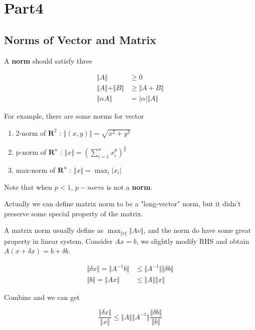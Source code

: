 \section{Part4}

\subsection{Norms of Vector and Matrix}

A \textbf{norm} should satisfy three

\begin{align}
  \Vert A \Vert &\geq 0 \nonumber \\
  \Vert A \Vert + \Vert B \Vert &\geq \Vert A+B \Vert \nonumber \\
  \Vert \alpha A \Vert &= |\alpha| \Vert A \Vert \nonumber
\end{align}

For example, there are some norms for vector
\begin{enumerate}
  \item 2-norm of $\mathbf{R} ^ 2$ :
    $\Vert (x, y) \Vert = \sqrt{x^2 + y^2}$
  \item p-norm of $\mathbf{R} ^ n$ :
    $\Vert x \Vert = \left( \sum_{i=1}^{n} x_i^p \right)^\frac{1}{p}$
  \item max-norm of $\mathbf{R} ^ n$ :
    $\Vert x \Vert = \max_i |x_i|$ 
\end{enumerate}

Note that when $p < 1$, $p-norm$ is not a \textbf{norm}.

Actually we can define matrix norm to be a "long-vector" norm,
but it didn't preserve some special property of the matrix.

A matrix norm usually define as $\max_{\Vert v\Vert} \Vert Av \Vert$,
and the norm do have some great property in linear system.
Consider $Ax = b$, we slightly modify RHS and obtain
$A(x + \delta x) = b + \delta b$.

\begin{align}
    \Vert \delta x\Vert = \Vert A^{-1}b \Vert &\leq \Vert A^{-1} \Vert \Vert \delta b \Vert \nonumber \\
    \Vert b\Vert = \Vert Ax \Vert &\leq \Vert A \Vert \Vert x \Vert \nonumber
\end{align}

Combine and we can get

\[
  \frac{\Vert \delta x \Vert}{\Vert x \Vert} \leq \Vert A \Vert \Vert A^{-1} \Vert
                                                  \frac{\Vert \delta b \Vert}{\Vert b\Vert}
\]


